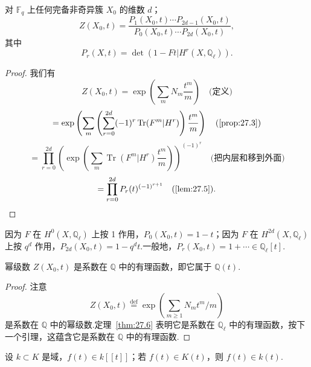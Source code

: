 \begin{theorem}\label{thm:27.6}
对 $\mathbb{F}_q$ 上任何完备非奇异簇 $X_0$ 的维数 $d$；
\[
Z(X_0, t) = \frac{P_1(X_0, t) \cdots P_{2d-1}(X_0, t)}{P_0(X_0, t) \cdots P_{2d}(X_0, t)},
\]
其中
\[
P_r(X, t) = \det(1 - Ft|H^{r}(X, \mathbb{Q}_{\ell})).
\]
\end{theorem}

\begin{proof}
我们有
\[
Z(X_0, t) = \exp\left( \sum_{m} N_m \frac{t^{m}}{m} \right) \quad \text{(定义)}
\]
\[
= \exp\left( \sum_{m} \left( \sum_{r=0}^{2d} (-1)^{r} \operatorname{Tr}(F^{m}|H^{r}) \right) \frac{t^{m}}{m} \right) \quad \text{(\ref{prop:27.3})}
\]
\[
= \prod_{r=0}^{2d} \left( \exp\left( \sum_{m} \operatorname{Tr}(F^{m}|H^{r}) \frac{t^{m}}{m} \right) \right)^{(-1)^{r}} \quad \text{(把内层和移到外面)}
\]
\[
= \prod_{r=0}^{2d} P_r(t)^{(-1)^{r+1}} \quad \text{(\ref{lem:27.5}).}
\]
\end{proof}

\begin{remark}\label{rem:27.7}
因为 $F$ 在 $H^{0}(X, \mathbb{Q}_{\ell})$ 上按 1 作用，$P_0(X_0, t) = 1 - t$；因为 $F$ 在 $H^{2d}(X, \mathbb{Q}_{\ell})$ 上按 $q^{d}$ 作用，$P_{2d}(X_0, t) = 1 - q^{d}t$.一般地，$P_r(X_0, t) = 1 + \cdots \in \mathbb{Q}_{\ell}[t]$.
\end{remark}

\begin{corollary}\label{cor:27.8}
幂级数 $Z(X_0, t)$ 是系数在 $\mathbb{Q}$ 中的有理函数，即它属于 $\mathbb{Q}(t)$.
\end{corollary}

\begin{proof}
注意
\[
Z(X_0, t) \overset{\mathrm{def}}{=} \exp\left( \sum_{m \geq 1} N_m t^{m}/m \right)
\]
是系数在 $\mathbb{Q}$ 中的幂级数.定理~\ref{thm:27.6} 表明它是系数在 $\mathbb{Q}_{\ell}$ 中的有理函数，按下一个引理，这蕴含它是系数在 $\mathbb{Q}$ 中的有理函数.
\end{proof}

\begin{lemma}\label{lem:27.9}
设 $k \subset K$ 是域，$f(t) \in k[[t]]$；若 $f(t) \in K(t)$，则 $f(t) \in k(t)$.
\end{lemma}

